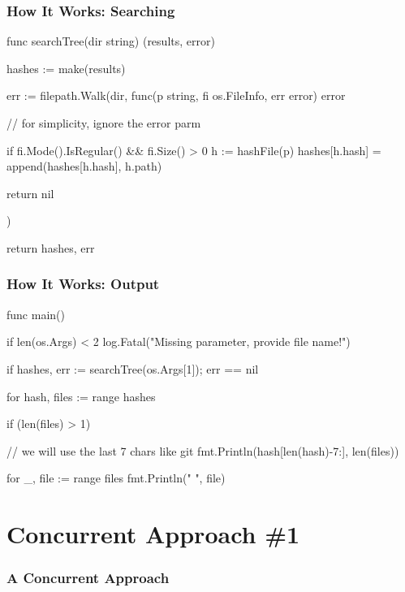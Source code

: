 \documentclass[handout,compress,t]{beamer}
\begin{document}
\begin{frame}[fragile]
    \frametitle{How It Works: Searching}
\begin{golang}
func searchTree(dir string) (results, error) {
	hashes := make(results)

	err := filepath.Walk(dir, func(p string, fi os.FileInfo,
                                   err error) error {
        // for simplicity, ignore the error parm

		if fi.Mode().IsRegular() && fi.Size() > 0 {
			h := hashFile(p)
			hashes[h.hash] = append(hashes[h.hash], h.path)
		}

		return nil
	})

	return hashes, err
}
\end{golang}
\end{frame}

\begin{frame}[fragile]
    \frametitle{How It Works: Output}
\begin{golang}
func main() {
    if len(os.Args) < 2 {
        log.Fatal("Missing parameter, provide file name!")
    }

    if hashes, err := searchTree(os.Args[1]); err == nil {
    	for hash, files := range hashes {
    		if (len(files) > 1) {
                // we will use the last 7 chars like git
    			fmt.Println(hash[len(hash)-7:], len(files))

    			for _, file := range files {
    				fmt.Println("   ", file)
    			}
    		}
    	}
    }
}
\end{golang}
\end{frame}

\section{Concurrent Approach \#1}
\begin{frame}
    \frametitle{A Concurrent Approach}
    \vspace{\baselineskip}
    \vspace{\baselineskip}
    \vspace{\baselineskip}
    \vspace{2\baselineskip}
    \vspace{\baselineskip}
\end{frame}
\end{document}

